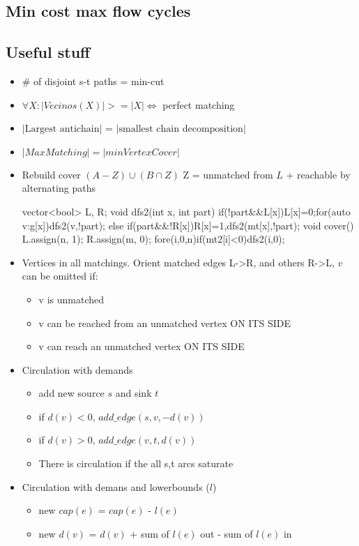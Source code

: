\subsection{Min cost max flow cycles}

\subsection{Useful stuff}

\begin{itemize}
	\item \# of disjoint s-t paths = min-cut
	\item $\forall X: |Vecinos(X)| >= |X| \iff$ perfect matching
	\item $|\text{Largest antichain}|$ = $|\text{smallest chain decomposition}|$
	\item $|Max Matching| = |min Vertex Cover|$
	\item Rebuild cover $(A-Z)\cup(B\cap Z)$ Z = unmatched from $L$ + reachable by alternating paths
	\begin{code}
	vector<bool> L, R;
	void dfs2(int x, int part) {
		if(!part&&L[x]){L[x]=0;for(auto v:g[x])dfs2(v,!part);}
		else if(part&&!R[x])R[x]=1,dfs2(mt[x],!part);
	}
	void cover() {L.assign(n, 1); R.assign(m, 0);
		fore(i,0,n)if(mt2[i]<0)dfs2(i,0);
	}\end{code}
	\item Vertices in all matchings. Orient matched edges L->R, and others R->L, $v$ can be omitted if:
		\begin{itemize}
			\item v is unmatched
			\item v can be reached from an unmatched vertex ON ITS SIDE
			\item v can reach an unmatched vertex ON ITS SIDE
		\end{itemize}
	\item Circulation with demands
	\begin{itemize}
		\item add new source $s$ and sink $t$
		\item if $d(v) < 0$, $add\_edge(s, v, -d(v))$
		\item if $d(v) > 0$, $add\_edge(v, t, d(v))$
		\item There is circulation if the all s,t arcs saturate
	\end{itemize}
	\item Circulation with demans and lowerbounds ($l$)
	\begin{itemize}
		\item new $cap(e)$ = $cap(e)$ - $l(e)$
		\item new $d(v)$ = $d(v)$ + sum of $l(e)$ out - sum of $l(e)$ in
	\end{itemize}
\end{itemize}

